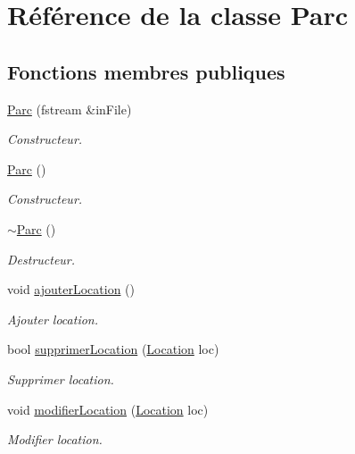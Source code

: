 \hypertarget{class_parc}{
\section{Référence de la classe Parc}
\label{class_parc}
}
\subsection*{Fonctions membres publiques}
\begin{DoxyCompactItemize}
\item 
\hyperlink{class_parc_ac974868bc248cc8ded2ac7c7d536251f}{Parc} (fstream \&inFile)
\begin{DoxyCompactList}\small\item\em Constructeur. \item\end{DoxyCompactList}\item 
\hyperlink{class_parc_ad7545bbf00b69b6bc47d8bc9e6584363}{Parc} ()
\begin{DoxyCompactList}\small\item\em Constructeur. \item\end{DoxyCompactList}\item 
\hyperlink{class_parc_a45de4ddcf862a8ad3da902bc63e0c1f6}{$\sim$Parc} ()
\begin{DoxyCompactList}\small\item\em Destructeur. \item\end{DoxyCompactList}\item 
void \hyperlink{class_parc_ad180ce771871b8f8790bf4703800d8b2}{ajouterLocation} ()
\begin{DoxyCompactList}\small\item\em Ajouter location. \item\end{DoxyCompactList}\item 
bool \hyperlink{class_parc_a9886186ab4182ee41a1480735600ed38}{supprimerLocation} (\hyperlink{class_location}{Location} loc)
\begin{DoxyCompactList}\small\item\em Supprimer location. \item\end{DoxyCompactList}\item 
void \hyperlink{class_parc_a4ce1969e29ebff5c149c7050e358e880}{modifierLocation} (\hyperlink{class_location}{Location} loc)
\begin{DoxyCompactList}\small\item\em Modifier location. \item\end{DoxyCompactList}\item 

\end{DoxyCompactItemize}
